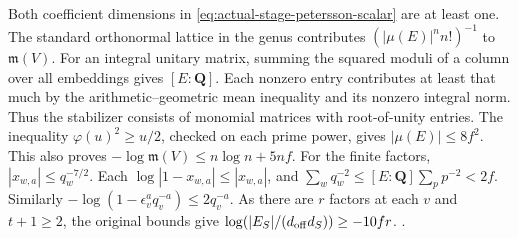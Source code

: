 Both coefficient dimensions in \eqref{eq:actual-stage-petersson-scalar}
are at least one. The standard orthonormal lattice in the genus
contributes \((|\mu(E)|^n n!)^{-1}\) to \(\mathfrak m(V)\).
For an integral unitary matrix, summing the squared moduli
of a column over all embeddings gives \([E:\mathbf Q]\).
Each nonzero entry contributes at least that much by the
arithmetic--geometric mean inequality and its nonzero integral
norm. Thus the stabilizer consists of monomial matrices with
root-of-unity entries. The inequality
\(\varphi(u)^2\ge u/2\), checked on each prime power, gives
\(|\mu(E)|\le 8f^2\). This also proves
\(-\log\mathfrak m(V)\le n\log n+5nf\).
For the finite factors, \(|x_{w,a}|\le q_w^{-7/2}\).
Each \(\log|1-x_{w,a}|\le|x_{w,a}|\), and
\(\sum_w q_w^{-2}\le [E:\mathbf Q]\sum_p p^{-2}<2f\).
Similarly \(-\log(1-\epsilon_v^a q_v^{-a})\le2q_v^{-a}\).
As there are \(r\) factors at each \(v\) and \(t+1\ge2\),
the original bounds give
\(\log(|E_S|/(d_{\rm off}d_S))\ge-10fr\).
.


